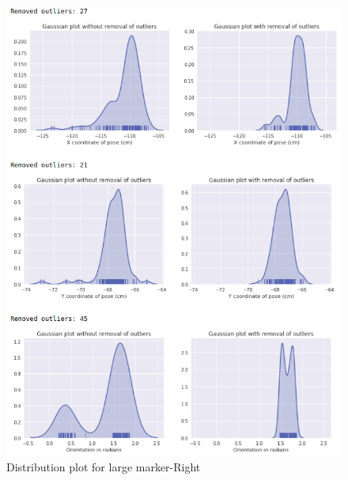 \documentclass[11pt,a4paper]{article}
\begin{document}
\begin{enumerate}
\begin{figure}[H]
					\includegraphics[scale=0.56]{large-right}
					\caption{Distribution plot for large marker-Right}	
				\end{figure}
				\end{enumerate}
				\newpage
\end{document}
